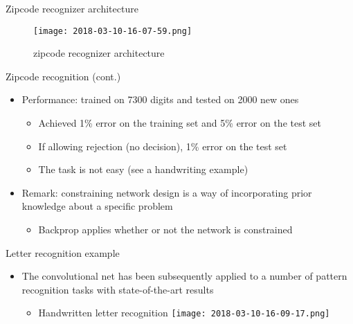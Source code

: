\documentclass[notes]{beamer}
\providecommand{\tightlist}{%
  \setlength{\itemsep}{0pt}\setlength{\parskip}{0pt}}
\begin{document}
\begin{frame}{Zipcode recognizer architecture}

\begin{figure}
\centering
\texttt{[image: 2018-03-10-16-07-59.png]}
\caption{zipcode recognizer architecture}
\end{figure}

\end{frame}

\begin{frame}{Zipcode recognition (cont.)}

\begin{itemize}
\tightlist
\item
  Performance: trained on 7300 digits and tested on 2000 new ones

  \begin{itemize}
  \tightlist
  \item
    Achieved 1\% error on the training set and 5\% error on the test set
  \item
    If allowing rejection (no decision), 1\% error on the test set
  \item
    The task is not easy (see a handwriting example)
  \end{itemize}
\item
  Remark: constraining network design is a way of incorporating prior
  knowledge about a specific problem

  \begin{itemize}
  \tightlist
  \item
    Backprop applies whether or not the network is constrained
  \end{itemize}
\end{itemize}

\end{frame}

\begin{frame}{Letter recognition example}

\begin{itemize}
\tightlist
\item
  The convolutional net has been subsequently applied to a number of
  pattern recognition tasks with state-of-the-art results

  \begin{itemize}
  \tightlist
  \item
    Handwritten letter recognition
    \texttt{[image: 2018-03-10-16-09-17.png]}
  \end{itemize}
\end{itemize}

\end{frame}
\end{document}
